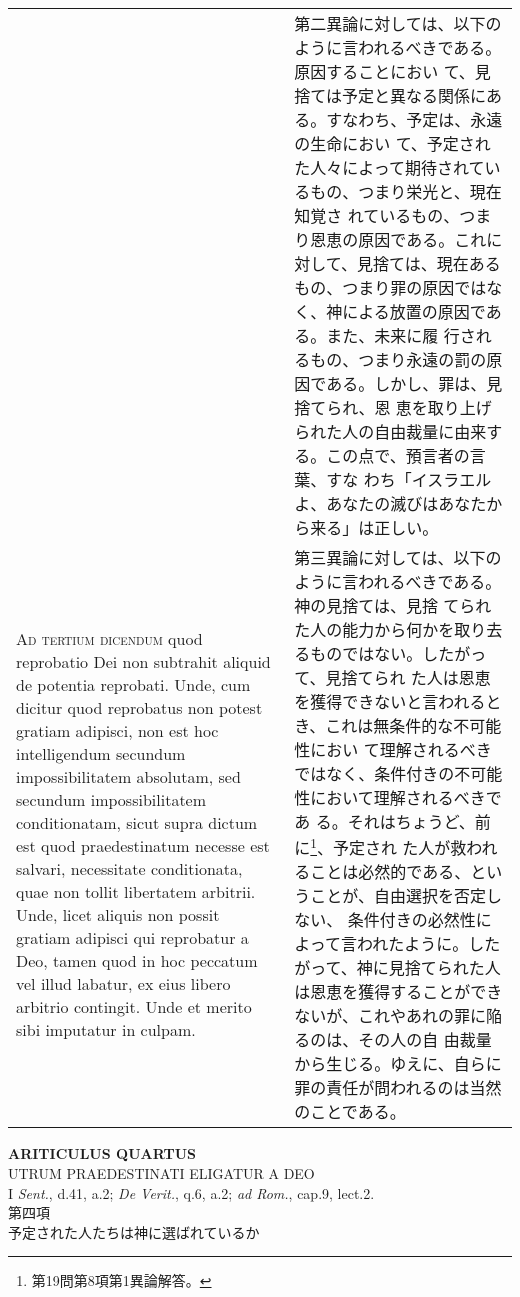 \documentclass[10pt]{jsarticle} %
\begin{document}
\begin{longtable}{p{21em}p{21em}}
&

第二異論に対しては、以下のように言われるべきである。原因することにおい
て、見捨ては予定と異なる関係にある。すなわち、予定は、永遠の生命におい
て、予定された人々によって期待されているもの、つまり栄光と、現在知覚さ
れているもの、つまり恩恵の原因である。これに対して、見捨ては、現在ある
もの、つまり罪の原因ではなく、神による放置の原因である。また、未来に履
行されるもの、つまり永遠の罰の原因である。しかし、罪は、見捨てられ、恩
恵を取り上げられた人の自由裁量に由来する。この点で、預言者の言葉、すな
わち「イスラエルよ、あなたの滅びはあなたから来る」は正しい。

 
\\


{\scshape Ad tertium dicendum} quod reprobatio Dei non
subtrahit aliquid de potentia reprobati. Unde, cum dicitur quod
reprobatus non potest gratiam adipisci, non est hoc intelligendum
secundum impossibilitatem absolutam, sed secundum impossibilitatem
conditionatam, sicut supra dictum est quod praedestinatum necesse est
salvari, necessitate conditionata, quae non tollit libertatem
arbitrii. Unde, licet aliquis non possit gratiam adipisci qui reprobatur
a Deo, tamen quod in hoc peccatum vel illud labatur, ex eius libero
arbitrio contingit. Unde et merito sibi imputatur in culpam.


&

第三異論に対しては、以下のように言われるべきである。神の見捨ては、見捨
てられた人の能力から何かを取り去るものではない。したがって、見捨てられ
た人は恩恵を獲得できないと言われるとき、これは無条件的な不可能性におい
て理解されるべきではなく、条件付きの不可能性において理解されるべきであ
る。それはちょうど、前に\footnote{第19問第8項第1異論解答。}、予定され
た人が救われることは必然的である、ということが、自由選択を否定しない、
条件付きの必然性によって言われたように。したがって、神に見捨てられた人
は恩恵を獲得することができないが、これやあれの罪に陥るのは、その人の自
由裁量から生じる。ゆえに、自らに罪の責任が問われるのは当然のことである。

 
\end{longtable}
\newpage





\begin{center}
 {\Large {\bf ARITICULUS QUARTUS}}\\
 {\large UTRUM PRAEDESTINATI ELIGATUR A DEO}\\
 {\footnotesize I {\itshape Sent.}, d.41, a.2; {\itshape De Verit.},
 q.6, a.2; {\itshape ad Rom.}, cap.9, lect.2.}\\
 {\Large 第四項\\予定された人たちは神に選ばれているか}
\end{center}
\end{document}
